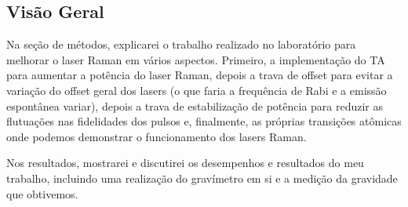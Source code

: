 \subsection{Visão Geral}
Na seção de métodos, explicarei o trabalho realizado no laboratório para melhorar o laser Raman em vários aspectos. Primeiro, a implementação do \gls{TA} para aumentar a potência do laser Raman, depois a trava de offset para evitar a variação do offset geral dos lasers (o que faria a frequência de Rabi e a emissão espontânea variar), depois a trava de estabilização de potência para reduzir as flutuações nas fidelidades dos pulsos e, finalmente, as próprias transições atômicas onde podemos demonstrar o funcionamento dos lasers Raman.

Nos resultados, mostrarei e discutirei os desempenhos e resultados do meu trabalho, incluindo uma realização do gravímetro em si e a medição da gravidade que obtivemos.
